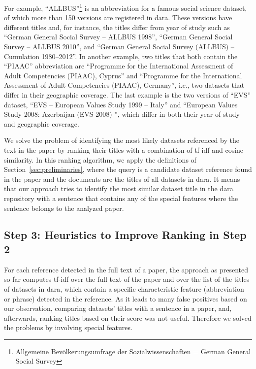 \documentclass{IOS-Book-Article}
\newcommand{\dara}{\textsf{da\textbar ra}}
\begin{document}
For example, \enquote{ALLBUS}\footnote{Allgemeine Bev\"olkerungsumfrage der Sozialwissenschaften = German General Social Survey} is an abbreviation for a famous social science dataset, of which more than 150 versions are registered in {\dara}. These versions have different titles and, for instance, the titles differ from year of study such as \enquote{German General
Social Survey -- ALLBUS 1998}, 
\enquote{German General Social Survey -- ALLBUS 2010}, and \enquote{German General Social Survey (ALLBUS) -- Cumulation 1980--2012}.
In another example, two titles that both contain the \enquote{PIAAC} abbreviation are \enquote{Programme for the International Assessment of Adult Competencies (PIAAC), Cyprus} and \enquote{Programme for the International Assessment of Adult Competencies (PIAAC), Germany}, i.e., two datasets that differ in their geographic coverage. The last example is the two versions of \enquote{EVS} dataset, 
\enquote{EVS -- European Values Study 1999 -- Italy} and \enquote{European Values Study 2008: Azerbaijan (EVS 2008) }, which differ in both their year of study and geographic coverage.

We solve the problem of identifying the most likely datasets referenced by the text in the paper by ranking their titles with a combination of tf-idf and cosine similarity. In this ranking algorithm, we apply the definitions of Section~\ref{sec:preliminaries}, where the query is a candidate dataset reference found in the paper and the documents are the titles of all datasets in {\dara}. 
It means that our approach tries to identify the most similar dataset title in the {\dara} repository with a sentence that contains any of the special features where the sentence belongs to the analyzed paper.

\subsection{Step 3: Heuristics to Improve Ranking in Step 2}
\label{sec:heur-impr-rank}

For each reference detected in the full text of a paper, the approach as presented so far computes tf-idf over the full text of the paper and over the list of the titles of datasets in {\dara}, which contain a specific characteristic feature (abbreviation or phrase) detected in the reference.
As it leads to many false positives based on our observation, comparing datasets' titles with a sentence in a paper, and, afterwards, ranking titles based on their score was not useful. Therefore we solved the problems by involving special features.
\end{document}
